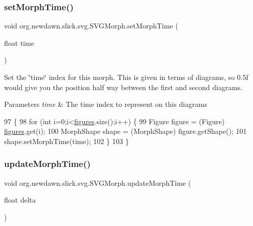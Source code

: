 \subsubsection{\texorpdfstring{set\+Morph\+Time()}{setMorphTime()}}
{\footnotesize\ttfamily void org.\+newdawn.\+slick.\+svg.\+S\+V\+G\+Morph.\+set\+Morph\+Time (\begin{DoxyParamCaption}\item[{float}]{time }\end{DoxyParamCaption})\hspace{0.3cm}{\ttfamily [inline]}}

Set the \char`\"{}time\char`\"{} index for this morph. This is given in terms of diagrams, so 0.\+5f would give you the position half way between the first and second diagrams.


\begin{DoxyParams}{Parameters}
{\em time} & The time index to represent on this diagrams \\
\hline
\end{DoxyParams}

\begin{DoxyCode}
97                                          \{
98         \textcolor{keywordflow}{for} (\textcolor{keywordtype}{int} i=0;i<\mbox{\hyperlink{classorg_1_1newdawn_1_1slick_1_1svg_1_1_s_v_g_morph_ab3f69a342347ec5d6fa4c65aa6671e4b}{figures}}.size();i++) \{
99             Figure figure = (Figure) \mbox{\hyperlink{classorg_1_1newdawn_1_1slick_1_1svg_1_1_s_v_g_morph_ab3f69a342347ec5d6fa4c65aa6671e4b}{figures}}.get(i);
100             MorphShape shape = (MorphShape) figure.getShape();
101             shape.setMorphTime(time);
102         \}
103     \}
\end{DoxyCode}
\mbox{\label{classorg_1_1newdawn_1_1slick_1_1svg_1_1_s_v_g_morph_afba9cd5655c85ee202a36f57afdbb86d}} 
\subsubsection{\texorpdfstring{update\+Morph\+Time()}{updateMorphTime()}}
{\footnotesize\ttfamily void org.\+newdawn.\+slick.\+svg.\+S\+V\+G\+Morph.\+update\+Morph\+Time (\begin{DoxyParamCaption}\item[{float}]{delta }\end{DoxyParamCaption})\hspace{0.3cm}{\ttfamily [inline]}}

